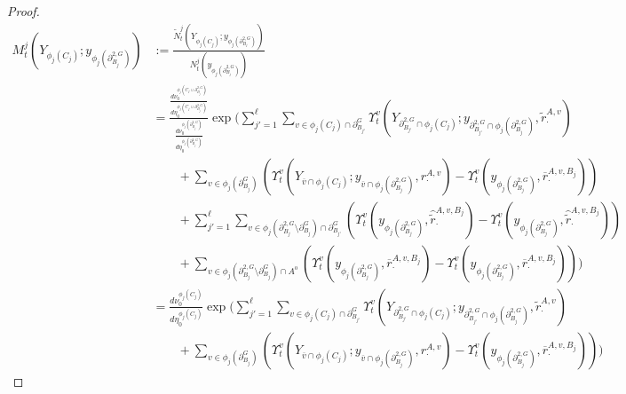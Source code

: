 \documentclass[12pt]{article}
\newcommand{\ov}{\overline}
\newcommand{\defeq}{:=}								%
\newcommand{\gneigh}[2]{\partial^{#1}_{#2}}			%
\newcommand{\dgneigh}[2]{\partial^{2,#1}_{#2}}		%
\newcommand{\cl}[1]{\ov{#1}}						%
\newcommand{\rate}{r}								%
\newcommand{\vind}[1]{_{#1}}						%
\newcommand{\vpara}[1]{^{#1}}						%
\newcommand{\stpara}[1]{_{#1}}						%
\newcommand{\tpara}[1]{_{#1}}						%
\newcommand{\gvpara}[2]{^{#1,#2}}					%
\newcommand{\psize}{\ell}							%
\newcommand{\Xg}{Y}									%
\newcommand{\brate}{\alt{\rate}}					%
\newcommand{\inte}[1]{{#1}^\mathrm{o}}				%
\newcommand{\alt}[1]{\tilde{#1}}					%
\newcommand{\mm}{\nu}								%
\newcommand{\bgrate}{\ov{\rate}}					%
\newcommand{\bcrate}{\hat{\brate}}					%
\newcommand{\mmm}{\eta}								%
\newcommand{\ds}{\Upsilon}							%
\newcommand{\densen}{N}								%
\newcommand{\denseph}{\alt{N}}						%
\newcommand{\mdense}{M}								%
\newcommand{\xg}{y}									%
\newcommand{\gvjpara}[3]{^{#1,#2,#3}}				%
\newcommand{\jpara}[1]{^{#1}}						%
\begin{document}
\begin{proof}
\begin{align*}
\mdense\jpara{j}\tpara{t}(\Xg\vind{\phi_j(C_j)};\xg\vind{\phi_j(\dgneigh{G}{B_j})}) &\defeq \frac{\denseph\jpara{j}\tpara{t}(\Xg\vind{\phi_j(C_j)};\xg\vind{\phi_j(\dgneigh{G}{B_j})})}{\densen\jpara{j}\tpara{t}(\xg\vind{\phi_j(\dgneigh{G}{B_j})})}\\
&= \frac{\frac{d\mm\vpara{\phi_j(C_j\cup \dgneigh{G}{B_j})}\tpara{0}}{d\mmm\vpara{\phi_j(C_j\cup \dgneigh{G}{B_j})}\tpara{0}}}{\frac{d\mm\vpara{\phi_j(\dgneigh{G}{B_j})}\tpara{0}}{d\mmm\vpara{\phi_j(\dgneigh{G}{B_j})}\tpara{0}}}\exp\Bigg(\sum_{j' = 1}^{\psize}\sum_{v \in \phi_j(C_j)\cap\gneigh{G}{B_{j'}}} \ds\vpara{v}\tpara{t}\left(\Xg\vind{\dgneigh{G}{B_{j'}}\cap\phi_j(C_j)};\xg\vind{\dgneigh{G}{B_{j'}}\cap\phi_j(\dgneigh{G}{B_j})},\brate\gvpara{A}{v}\stpara{\cdot}\right)\\
&\hspace{24pt} + \sum_{v \in \phi_j(\gneigh{G}{B_j})} \left(\ds\vpara{v}\tpara{t}\left(\Xg\vind{\cl{v}\cap\phi_j(C_j)};\xg\vind{\cl{v}\cap\phi_j(\dgneigh{G}{B_j})},\rate\gvpara{A}{v}\stpara{\cdot}\right) - \ds\vpara{v}\tpara{t}\left(\xg\vind{\phi_j(\dgneigh{G}{B_j})},\bgrate\gvjpara{A}{v}{B_j}\stpara{\cdot}\right)\right)\\
&\hspace{24pt} +  \sum_{j'=1}^\psize \sum_{v \in \phi_j(\dgneigh{G}{B_j}\setminus\gneigh{G}{B_j})\cap \gneigh{G}{B_{j'}}} \left(\ds\vpara{v}\tpara{t}\left(\xg\vind{\phi_j(\dgneigh{G}{B_j})},\bcrate\gvjpara{A}{v}{B_j}\stpara{\cdot}\right) - \ds\vpara{v}\tpara{t}\left(\xg\vind{\phi_j(\dgneigh{G}{B_j})},\bcrate\gvjpara{A}{v}{B_j}\stpara{\cdot}\right)\right)\\
&\hspace{24pt} +  \sum_{v \in \phi_j(\dgneigh{G}{B_j}\setminus\gneigh{G}{B_j})\cap\inte{A}} \left(\ds\vpara{v}\tpara{t}\left(\xg\vind{\phi_j(\dgneigh{G}{B_j})},\bgrate\gvjpara{A}{v}{B_j}\stpara{\cdot}\right) - \ds\vpara{v}\tpara{t}\left(\xg\vind{\phi_j(\dgneigh{G}{B_j})},\bgrate\gvjpara{A}{v}{B_j}\stpara{\cdot}\right)\right)\Bigg)\\
&= \frac{d\mm\vpara{\phi_j(C_j)}\tpara{0}}{d\mmm\vpara{\phi_j(C_j)}\tpara{0}}\exp\Bigg(\sum_{j' = 1}^{\psize}\sum_{v \in \phi_j(C_j)\cap\gneigh{G}{B_{j'}}} \ds\vpara{v}\tpara{t}\left(\Xg\vind{\dgneigh{G}{B_{j'}}\cap\phi_j(C_j)};\xg\vind{\dgneigh{G}{B_{j'}}\cap\phi_j(\dgneigh{G}{B_j})},\brate\gvpara{A}{v}\stpara{\cdot}\right)\\
&\hspace{24pt} + \sum_{v \in \phi_j(\gneigh{G}{B_j})} \left(\ds\vpara{v}\tpara{t}\left(\Xg\vind{\cl{v}\cap\phi_j(C_j)};\xg\vind{\cl{v}\cap\phi_j(\dgneigh{G}{B_j})},\rate\gvpara{A}{v}\stpara{\cdot}\right) - \ds\vpara{v}\tpara{t}\left(\xg\vind{\phi_j(\dgneigh{G}{B_j})},\bgrate\gvjpara{A}{v}{B_j}\stpara{\cdot}\right)\right)\Bigg)
\end{align*}


\end{proof}
\end{document}
